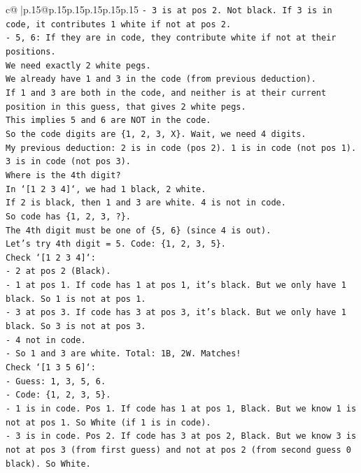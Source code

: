 \documentclass{article}
\begin{document}
{\begin{supertabular}{c@{$\;$}|p{.15\linewidth}@{}p{.15\linewidth}p{.15\linewidth}p{.15\linewidth}p{.15\linewidth}p{.15\linewidth}}
{{{\texttt{{-} 3 is at pos 2. Not black. If 3 is in code, it contributes 1 white if not at pos 2.} \\
\texttt{{-} 5, 6: If they are in code, they contribute white if not at their positions.} \\
\texttt{We need exactly 2 white pegs.} \\
\texttt{We already have 1 and 3 in the code (from previous deduction).} \\
\texttt{If 1 and 3 are both in the code, and neither is at their current position in this guess, that gives 2 white pegs.} \\
\texttt{This implies 5 and 6 are NOT in the code.} \\
\texttt{So the code digits are \{1, 2, 3, X\}. Wait, we need 4 digits.} \\
\texttt{My previous deduction: 2 is in code (pos 2). 1 is in code (not pos 1). 3 is in code (not pos 3).} \\
\texttt{Where is the 4th digit?} \\
\texttt{In `{[}1 2 3 4{]}`, we had 1 black, 2 white.} \\
\texttt{If 2 is black, then 1 and 3 are white. 4 is not in code.} \\
\texttt{So code has \{1, 2, 3, ?\}.} \\
\texttt{The 4th digit must be one of \{5, 6\} (since 4 is out).} \\
\texttt{Let's try 4th digit = 5. Code: \{1, 2, 3, 5\}.} \\
\texttt{Check `{[}1 2 3 4{]}`:} \\
\texttt{{-} 2 at pos 2 (Black).} \\
\texttt{{-} 1 at pos 1. If code has 1 at pos 1, it's black. But we only have 1 black. So 1 is not at pos 1.} \\
\texttt{{-} 3 at pos 3. If code has 3 at pos 3, it's black. But we only have 1 black. So 3 is not at pos 3.} \\
\texttt{{-} 4 not in code.} \\
\texttt{{-} So 1 and 3 are white. Total: 1B, 2W. Matches!} \\
\texttt{Check `{[}1 3 5 6{]}`:} \\
\texttt{{-} Guess: 1, 3, 5, 6.} \\
\texttt{{-} Code: \{1, 2, 3, 5\}.} \\
\texttt{{-} 1 is in code. Pos 1. If code has 1 at pos 1, Black. But we know 1 is not at pos 1. So White (if 1 is in code).} \\
\texttt{{-} 3 is in code. Pos 2. If code has 3 at pos 2, Black. But we know 3 is not at pos 3 (from first guess) and not at pos 2 (from second guess 0 black). So White.} \\
}}}
\end{supertabular}}
\end{document}
